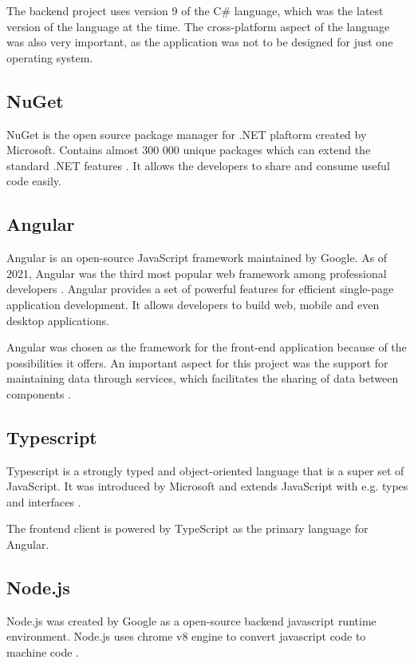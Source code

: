 \documentclass[a4paper,twoside,12pt]{book}
\begin{document}
The backend project uses version 9 of the C\# language, which was the latest version of the language at the time. The cross-platform aspect of the language was also very important, as the application was not to be designed for just one operating system. 

\subsection{NuGet}
NuGet is the open source package manager for .NET plaftorm created by Microsoft. Contains almost 300 000 unique packages which can extend the standard .NET features \cite{bib:nuget}. It allows the developers to share and consume useful code easily.

\subsection{Angular}
Angular is an open-source JavaScript framework maintained by Google. As of 2021, Angular was the third most popular web framework among professional developers \cite{bib:stackSurvey}. Angular provides a set of powerful features for efficient single-page application development. It allows developers to build web, mobile and even desktop applications.

Angular was chosen as the framework for the front-end application because of the possibilities it offers. An important aspect for this project was the support for maintaining data through services, which facilitates the sharing of data between components \cite{bib:angular}.

\subsection{Typescript}
Typescript is a strongly typed and object-oriented language that is a super set of JavaScript. It was introduced by Microsoft and extends JavaScript with e.g. types and interfaces \cite{bib:typescript}.

The frontend client is powered by TypeScript as the primary language for Angular.

\subsection{Node.js}
Node.js was created by Google as a open-source backend javascript runtime environment. Node.js uses chrome v8 engine to convert javascript code to machine code \cite{bib:nodeJs}.
\end{document}
